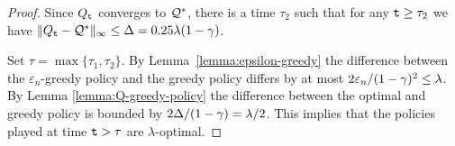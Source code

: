 \begin{advanced}
\begin{proof}
Since $Q_{\tt t}$ converges to $\mathcal{Q}^*$, there is a time $\tau_2$ such that for any ${\tt t}\geq \tau_2$ we have $\|Q_{\tt t}-\mathcal{Q}^*\|_\infty \leq \Delta=0.25\lambda (1-\gamma)$.

Set $\tau=\max\{\tau_1,\tau_2\}$. By
Lemma~\ref{lemma:epsilon-greedy} the difference between the
$\varepsilon_n$-greedy policy and the greedy policy differs by at most $2\varepsilon_n/(1-\gamma)^2\leq \lambda$. By Lemma
\ref{lemma:Q-greedy-policy} the difference between the optimal and
greedy policy is bounded by $2\Delta/(1-\gamma)=\lambda/2$. This
implies that the policies played at time ${\tt t}>\tau$ are
$\lambda$-optimal.
\end{proof}











\end{advanced}
